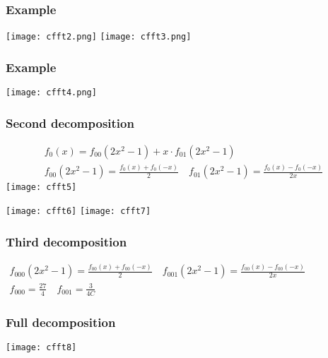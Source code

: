 \documentclass{beamer}
\begin{document}
\begin{frame}
	\frametitle{Example}
	\texttt{[image: cfft2.png]}
	\texttt{[image: cfft3.png]}
\end{frame}

\begin{frame}
	\frametitle{Example}
	\texttt{[image: cfft4.png]}
	
\end{frame}

\begin{frame}
	\frametitle{Second decomposition}
	
$$
\begin{gathered}
f_0(x)=f_{00}\left(2 x^2-1\right)+x \cdot f_{01}\left(2 x^2-1\right) \\
f_{00}\left(2 x^2-1\right)=\frac{f_0(x)+f_0(-x)}{2} \quad f_{01}\left(2 x^2-1\right)=\frac{f_0(x)-f_0(-x)}{2 x}
\end{gathered}
$$
\texttt{[image: cfft5]}
\end{frame}

\begin{frame}
	\texttt{[image: cfft6]}
	\texttt{[image: cfft7]}
\end{frame}

\begin{frame}
	\frametitle{Third decomposition}
	$\begin{gathered}f_{000}\left(2 x^2-1\right)=\frac{f_{00}(x)+f_{00}(-x)}{2} \quad f_{001}\left(2 x^2-1\right)=\frac{f_{00}(x)-f_{00}(-x)}{2 x} \\ f_{000}=\frac{27}{4} \quad f_{001}=\frac{3}{4 C}\end{gathered}$
\end{frame}

\begin{frame}
	\frametitle{Full decomposition}
	\texttt{[image: cfft8]}
\end{frame}
\end{document}
